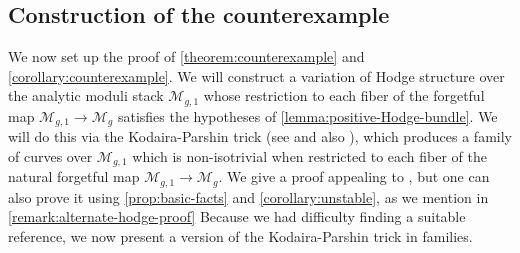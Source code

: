 \subsection{Construction of the counterexample}
We now set up the proof of \autoref{theorem:counterexample} and
\autoref{corollary:counterexample}. We will construct a variation of Hodge
structure over the analytic moduli stack $\mathscr{M}_{g,1}$ whose restriction to each fiber of the forgetful map $\mathscr{M}_{g,1}\to \mathscr{M}_g$ satisfies the hypotheses of \autoref{lemma:positive-Hodge-bundle}. We will do this via the Kodaira-Parshin trick
(see
\cite[Proposition 7]{parshin:algebraic-curves-over-function-fields-i}
and also
\cite[Proposition 7.1]{lawrenceV:diophantine-problems}),
which produces a family of curves over $\mathscr{M}_{g,1}$ which is non-isotrivial when restricted to each fiber of the natural forgetful map $\mathscr{M}_{g,1}\to \mathscr{M}_g$.
We give a proof appealing to \cite{cataneseD:answer-to-a-question-by-fujita},
but one can also prove it using \autoref{prop:basic-facts}  and
\autoref{corollary:unstable}, as we mention in
\autoref{remark:alternate-hodge-proof}
Because we had difficulty finding a suitable reference, we now present a version
of the Kodaira-Parshin trick in families.

